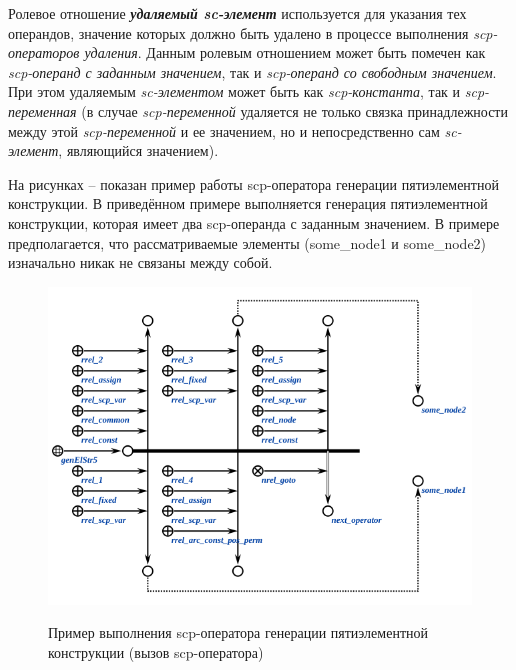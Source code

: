 Ролевое отношение \textbf{\textit{удаляемый sc-элемент\scnrolesign}} используется для указания тех операндов, значение которых должно быть удалено в процессе выполнения \textit{scp-операторов удаления}. Данным ролевым отношением может быть помечен как \textit{scp-операнд с заданным значением\scnrolesign}, так и \textit{scp-операнд со свободным значением\scnrolesign}. При этом удаляемым \textit{sc-элементом} может быть как \textit{scp-константа\scnrolesign}, так и \textit{scp-переменная\scnrolesign} (в случае \textit{scp-переменной\scnrolesign} удаляется не только связка принадлежности между этой \textit{scp-переменной\scnrolesign} и ее значением, но и непосредственно сам \textit{sc-элемент}, являющийся значением).

\begin{SCn}
\begin{scnhaselementset}
\end{scnhaselementset}
\begin{scnhaselementset}
\end{scnhaselementset}
\end{SCn}

На рисунках \textit{} -- \textit{} показан пример работы scp-оператора генерации пятиэлементной конструкции. В приведённом примере выполняется генерация пятиэлементной конструкции, которая имеет два scp-операнда с заданным значением. В примере предполагается, что рассматриваемые элементы (some\_node1 и some\_node2) изначально никак не связаны между собой.

\begin{figure}[H]
	\centering
	\caption{Пример выполнения scp-оператора генерации пятиэлементной конструкции (вызов scp-оператора)}
	\includegraphics[scale=0.8]{images/part3/chapter_situation_management/genElStr5_fafaa.png}
	\label{fig:genElStr5_fafaa}
\end{figure}

